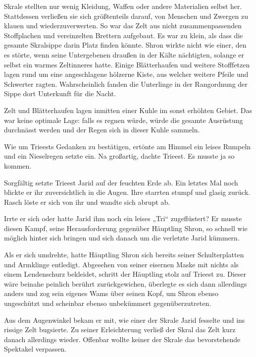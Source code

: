 Skrale stellten nur wenig Kleidung, Waffen oder andere Materialien selbst her. Stattdessen verließen sie sich größtenteils darauf, von Menschen und Zwergen zu klauen und wiederzuverwerten. So war das Zelt aus nicht zusammenpassenden Stoffplachen und vereinzelten Brettern aufgebaut. Es war zu klein, als dass die gesamte Skralsippe darin Platz finden könnte. Shron wirkte nicht wie einer, den es störte, wenn seine Untergebenen draußen in der Kälte nächtigten, solange er selbst ein warmes Zeltinneres hatte. Einige Blätterhaufen und weitere Stofffetzen lagen rund um eine angeschlagene hölzerne Kiste, aus welcher weitere Pfeile und Schwerter ragten. Wahrscheinlich fanden die Unterlinge in der Rangordnung der Sippe dort Unterkunft für die Nacht.

Zelt und Blätterhaufen lagen inmitten einer Kuhle im sonst erhöhten Gebiet. Das war keine optimale Lage: falls es regnen würde, würde die gesamte Ausrüstung durchnässt werden und der Regen sich in dieser Kuhle sammeln.

Wie um Trieests Gedanken zu bestätigen, ertönte am Himmel ein leises Rumpeln und ein Nieselregen setzte ein. Na großartig, dachte Trieest. Es musste ja so kommen.

Sorgfältig setzte Trieest Jarid auf der feuchten Erde ab. Ein letztes Mal noch blickte er ihr zuversichtlich in die Augen. Ihre starrten stumpf und glasig zurück. Rasch löste er sich von ihr und wandte sich abrupt ab.

Irrte er sich oder hatte Jarid ihm noch ein leises „Tri“ zugeflüstert? Er musste diesen Kampf, seine Herausforderung gegenüber Häuptling Shron, so schnell wie möglich hinter sich bringen und sich danach um die verletzte Jarid kümmern.

Als er sich umdrehte, hatte Häuptling Shron sich bereits seiner Schulterplatten und Armklinge entledigt. Abgesehen von seiner eisernen Maske mit nichts als einem Lendenschurz bekleidet, schritt der Häuptling stolz auf Trieest zu. Dieser wäre beinahe peinlich berührt zurückgewichen, überlegte es sich dann allerdings anders und zog sein eigenes Wams über seinen Kopf, um Shron ebenso ungeschützt und scheinbar ebenso unbekümmert gegenüberzutreten.

Aus dem Augenwinkel bekam er mit, wie einer der Skrale Jarid fesselte und ins rissige Zelt bugsierte. Zu seiner Erleichterung verließ der Skral das Zelt kurz danach allerdings wieder. Offenbar wollte keiner der Skrale das bevorstehende Spektakel verpassen.

